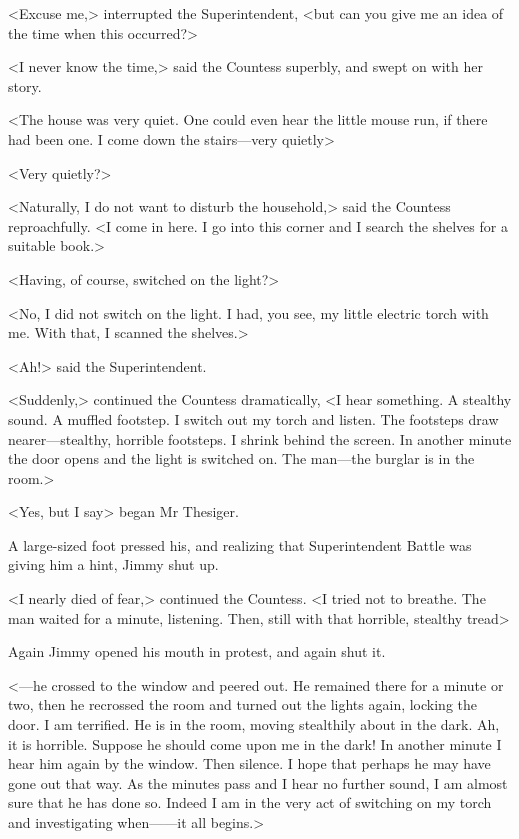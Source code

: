 <Excuse me,> interrupted the Superintendent, <but can you give me an idea of the time when this occurred?>

<I never know the time,> said the Countess superbly, and swept on with her story.

<The house was very quiet. One could even hear the little mouse run, if there had been one. I come down the stairs—very quietly\longdash>

<Very quietly?>

<Naturally, I do not want to disturb the household,> said the Countess reproachfully. <I come in here. I go into this corner and I search the shelves for a suitable book.>

<Having, of course, switched on the light?>

<No, I did not switch on the light. I had, you see, my little electric torch with me. With that, I scanned the shelves.>

<Ah!> said the Superintendent.

<Suddenly,> continued the Countess dramatically, <I hear something. A stealthy sound. A muffled footstep. I switch out my torch and listen. The footsteps draw nearer—stealthy, horrible footsteps. I shrink behind the screen. In another minute the door opens and the light is switched on. The man—the burglar is in the room.>

<Yes, but I say\longdash> began Mr Thesiger.

A large-sized foot pressed his, and realizing that Superintendent Battle was giving him a hint, Jimmy shut up.

<I nearly died of fear,> continued the Countess. <I tried not to breathe. The man waited for a minute, listening. Then, still with that horrible, stealthy tread\longdash>

Again Jimmy opened his mouth in protest, and again shut it.

<—he crossed to the window and peered out. He remained there for a minute or two, then he recrossed the room and turned out the lights again, locking the door. I am terrified. He is in the room, moving stealthily about in the dark. Ah, it is horrible. Suppose he should come upon me in the dark! In another minute I hear him again by the window. Then silence. I hope that perhaps he may have gone out that way. As the minutes pass and I hear no further sound, I am almost sure that he has done so. Indeed I am in the very act of switching on my torch and investigating when——it all begins.>

